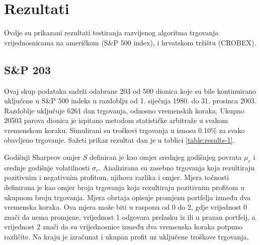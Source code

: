 \documentclass[lmodern, utf8, diplomski, numeric]{fer}
\begin{document}
  \chapter{Rezultati}
  \label{ch:rezultati}
  Ovdje su prikazani rezultati testiranja razvijenog algoritma trgovanja vrijednosnicama na američkom (S\&P 500 index), i hrvatskom tržištu (CROBEX).
  
  \section{S\&P 203}
  Ovaj skup podataka sadrži odabrane 203 od 500 dionica koje su bile kontinuirano uključene u S\&P 500 indeks u razdoblju od 1. siječnja 1980. do 31. prosinca 2003.
  Razdoblje uključuje 6261 dan trgovanja, odnosno vremenskih koraka.
  Ukupno 20503 parova dionica je ispitano metodom statističke arbitraže u svakom vremenskom koraku.
  Simulirani su troškovi trgovanja u iznosu 0.10\% za svako obavljeno trgovanje.
  Sažeti prikaz rezultat dan je u tablici \ref{table:results-1}.
  
  Godišnji Sharpeov omjer $S$ definiran je kao omjer srednjeg godišnjeg povrata $\mu_r$ i srednje godišnje volatilnosti $\sigma_r$.
  Analizirana su zasebno trgovanja koja rezultiraju pozitivnim i negativnim profitom, njihova razlika i omjer.
  Mjera točnosti definirana je kao omjer broja trgovanja koja rezultiraju pozitivnim profitom u ukupnom broju trgovanja.
  Mjera obrtaja  opisuje promjenu portfelja između dva vremenska koraka.
  Ova mjera može biti u rasponu od 0 do 2, gdje vrijednost 0 znači da nema promjene, vrijednost 1 odgovara prelasku iz ili u prazan portfelj, a vrijednost 2 znači da su vrijednosnice između dva vremenska koraka potpuno različite.
  Na kraju je izračunat i ukupan profit uz uključene troškove trgovanja.
  
\end{document}
